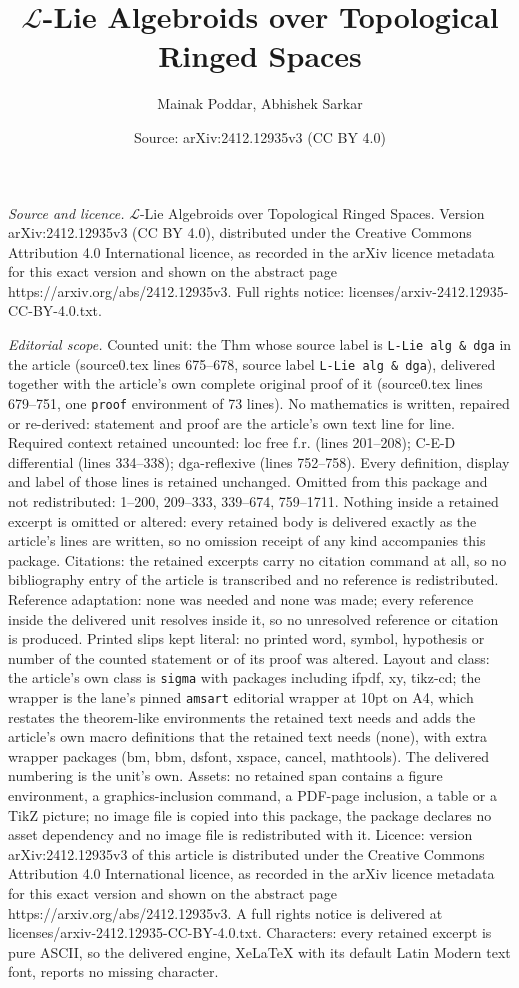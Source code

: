\documentclass[10pt,a4paper]{amsart}
\title[$\mathcal{L}$-Lie Algebroids over Topological Ringed Spaces]{$\mathcal{L}$-Lie Algebroids over Topological Ringed Spaces}
\author{Mainak Poddar, Abhishek Sarkar}
\date{Source: arXiv:2412.12935v3 (CC BY 4.0)}
\begin{document}
\maketitle

\noindent\emph{Source and licence.} $\mathcal{L}$-Lie Algebroids over Topological Ringed Spaces. Version arXiv:2412.12935v3 (CC BY 4.0), distributed under the Creative Commons Attribution 4.0 International licence, as recorded in the arXiv licence metadata for this exact version and shown on the abstract page https://arxiv.org/abs/2412.12935v3. Full rights notice: licenses/arxiv-2412.12935-CC-BY-4.0.txt.\par\smallskip

\noindent\textit{Editorial scope.} Counted unit: the Thm whose source label is \texttt{L-Lie alg \& dga} in the article (source0.tex lines 675--678, source label \texttt{L-Lie alg \& dga}), delivered together with the article's own complete original proof of it (source0.tex lines 679--751, one \texttt{proof} environment of 73 lines). No mathematics is written, repaired or re-derived: statement and proof are the article's own text line for line. Required context retained uncounted: loc free f.r. (lines 201--208); C-E-D differential (lines 334--338); dga-reflexive (lines 752--758). Every definition, display and label of those lines is retained unchanged. Omitted from this package and not redistributed: 1--200, 209--333, 339--674, 759--1711. Nothing inside a retained excerpt is omitted or altered: every retained body is delivered exactly as the article's lines are written, so no omission receipt of any kind accompanies this package. Citations: the retained excerpts carry no citation command at all, so no bibliography entry of the article is transcribed and no reference is redistributed. Reference adaptation: none was needed and none was made; every reference inside the delivered unit resolves inside it, so no unresolved reference or citation is produced. Printed slips kept literal: no printed word, symbol, hypothesis or number of the counted statement or of its proof was altered. Layout and class: the article's own class is \texttt{sigma} with packages including ifpdf, xy, tikz-cd; the wrapper is the lane's pinned \texttt{amsart} editorial wrapper at 10pt on A4, which restates the theorem-like environments the retained text needs and adds the article's own macro definitions that the retained text needs (none), with extra wrapper packages (bm, bbm, dsfont, xspace, cancel, mathtools). The delivered numbering is the unit's own. Assets: no retained span contains a figure environment, a graphics-inclusion command, a PDF-page inclusion, a table or a TikZ picture; no image file is copied into this package, the package declares no asset dependency and no image file is redistributed with it. Licence: version arXiv:2412.12935v3 of this article is distributed under the Creative Commons Attribution 4.0 International licence, as recorded in the arXiv licence metadata for this exact version and shown on the abstract page https://arxiv.org/abs/2412.12935v3. A full rights notice is delivered at licenses/arxiv-2412.12935-CC-BY-4.0.txt. Characters: every retained excerpt is pure ASCII, so the delivered engine, XeLaTeX with its default Latin Modern text font, reports no missing character.
\end{document}
